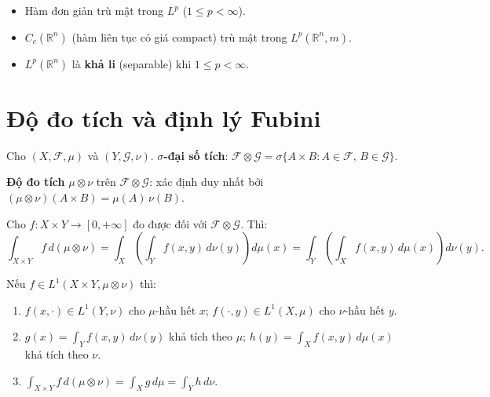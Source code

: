 \documentclass[12pt,a4paper]{article}
\begin{document}
\begin{dinhly}[title={Tập trù mật}]
  \begin{itemize}
    \item Hàm đơn giản trù mật trong $L^p$ ($1 \le p < \infty$).
    \item $C_c(\mathbb{R}^n)$ (hàm liên tục có giá compact) trù mật trong $L^p(\mathbb{R}^n, m)$.
    \item $L^p(\mathbb{R}^n)$ là \textbf{khả li} (separable) khi $1 \le p < \infty$.
  \end{itemize}
\end{dinhly}

\section{Độ đo tích và định lý Fubini}

\begin{dinhnghia}[title={Độ đo tích}]
  Cho $(X, \mathcal{F}, \mu)$ và $(Y, \mathcal{G}, \nu)$. \textbf{$\sigma$-đại số tích}: $\mathcal{F} \otimes \mathcal{G} = \sigma\{A \times B : A \in \mathcal{F},\, B \in \mathcal{G}\}$.

  \textbf{Độ đo tích} $\mu \otimes \nu$ trên $\mathcal{F} \otimes \mathcal{G}$: xác định duy nhất bởi $(\mu \otimes \nu)(A \times B) = \mu(A)\,\nu(B)$.
\end{dinhnghia}

\begin{dinhly}[title={Định lý Tonelli (hàm không âm)}]
  Cho $f: X \times Y \to [0, +\infty]$ đo được đối với $\mathcal{F} \otimes \mathcal{G}$. Thì:
  \[
    \int_{X \times Y} f\,d(\mu \otimes \nu) = \int_X\!\left(\int_Y f(x,y)\,d\nu(y)\right)d\mu(x) = \int_Y\!\left(\int_X f(x,y)\,d\mu(x)\right)d\nu(y).
  \]
\end{dinhly}

\begin{dinhly}[title={Định lý Fubini}]
  Nếu $f \in L^1(X \times Y, \mu \otimes \nu)$ thì:
  \begin{enumerate}
    \item $f(x, \cdot) \in L^1(Y, \nu)$ cho $\mu$-hầu hết $x$; \;$f(\cdot, y) \in L^1(X, \mu)$ cho $\nu$-hầu hết $y$.
    \item $g(x) = \displaystyle\int_Y f(x,y)\,d\nu(y)$ khả tích theo $\mu$; \;$h(y) = \displaystyle\int_X f(x,y)\,d\mu(x)$ khả tích theo $\nu$.
    \item $\displaystyle\int_{X \times Y} f\,d(\mu \otimes \nu) = \int_X g\,d\mu = \int_Y h\,d\nu$.
  \end{enumerate}
\end{dinhly}
\end{document}
